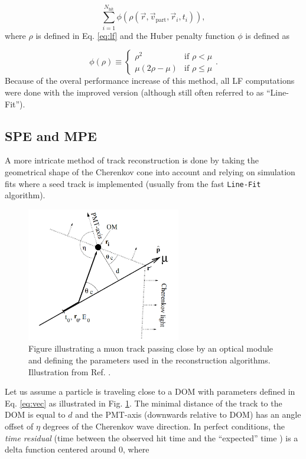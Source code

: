 \begin{equation}
\sum^{N_{\textrm{hit}}}_{i=1} \phi(\rho(\vec{r},\vec{v}_\textrm{part},\vec{r}_i,t_i)),
\end{equation}
\noindent where $\rho$ is defined in Eq. \ref{eq:lf} and the Huber penalty function $\phi$ is defined as

\begin{equation}
\phi(\rho) \equiv \left\{
    \begin{array}{ll}
        \rho^2 &\textrm{if } \rho < \mu \\
        \mu\left(2\rho - \mu\right) & \textrm{if }\rho \leq \mu
    \end{array}
    \right.
    .
\end{equation}
\noindent Because of the overal performance increase of this method, all LF computations were done with the improved version (although still often referred to as ``Line-Fit'').

\subsection{SPE and MPE}
\label{subsec:spempe}
A more intricate method of track reconstruction is done by taking the geometrical shape of the Cherenkov cone into account and relying on simulation fits where a seed track is implemented (usually from the fast \texttt{Line-Fit} algorithm).


\begin{figure}
\centering
\includegraphics[width=0.6\textwidth]{chapter7/img/reconstruction.png}
\caption{Figure illustrating a muon track passing close by an optical module and defining the parameters used in the reconstruction algorithms. Illustration from Ref. \cite{Ahrens:2003fg}.}
\label{fig:reconstruction}
\end{figure}

Let us assume a particle is traveling close to a DOM with parameters defined in Eq. \ref{eq:vec} as illustrated in Fig. \ref{fig:reconstruction}. The minimal distance of the track to the DOM is equal to $d$ and the PMT-axis (downwards relative to DOM) has an angle offset of $\eta$ degrees of the Cherenkov wave direction. In perfect conditions, the \textit{time residual} (time between the observed hit time and the ``expected'' time ) is a delta function centered around 0, where

